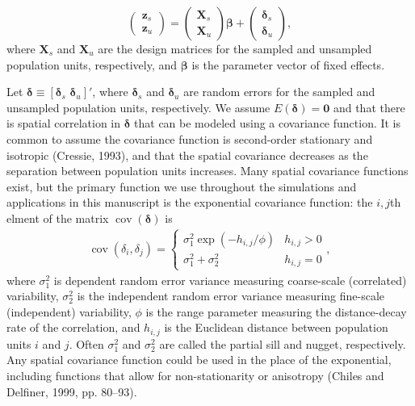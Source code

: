 \documentclass[]{elsarticle} %
\begin{document}
\begin{equation}
\begin{pmatrix} \label{equation:Zmarginal}
    \mathbf{z}_s      \\
    \mathbf{z}_u
\end{pmatrix}
=
\begin{pmatrix}
  \mathbf{X}_s    \\
  \mathbf{X}_u
\end{pmatrix}
\bm{\beta} +
\begin{pmatrix}
\bm{\delta}_s    \\
\bm{\delta}_u
\end{pmatrix},
\end{equation} where \(\mathbf{X}_s\) and \(\mathbf{X}_u\) are the
design matrices for the sampled and unsampled population units,
respectively, and \(\bm{\beta}\) is the parameter vector of fixed
effects.

Let \(\bm{\delta} \equiv [\bm{\delta}_s \,\, \bm{\delta}_u]'\), where
\(\bm{\delta}_s\) and \(\bm{\delta}_u\) are random errors for the
sampled and unsampled population units, respectively. We assume
\(E(\bm{\delta}) = \mathbf{0}\) and that there is spatial correlation in
\(\bm{\delta}\) that can be modeled using a covariance function. It is
common to assume the covariance function is second-order stationary and
isotropic (Cressie, 1993), and that the spatial covariance decreases as
the separation between population units increases. Many spatial
covariance functions exist, but the primary function we use throughout
the simulations and applications in this manuscript is the exponential
covariance function: the \(i,j\)th elment of the matrix
\(\mathop{\mathrm{{cov}}}(\bm{\delta})\) is \mbox{}
\begin{align}\label{equation:expcov}
\mathop{\mathrm{{cov}}}(\delta_i, \delta_j) = 
\begin{cases} 
\sigma^2_{1}\exp(-h_{i,j}/\phi) & h_{i,j} > 0 \\
\sigma^2_{1} + \sigma^2_2 & h_{i,j} = 0
\end{cases}
,
\end{align} where \(\sigma^2_{1}\) is dependent random error variance
measuring coarse-scale (correlated) variability, \(\sigma^2_{2}\) is the
independent random error variance measuring fine-scale (independent)
variability, \(\phi\) is the range parameter measuring the
distance-decay rate of the correlation, and \(h_{i,j}\) is the Euclidean
distance between population units \(i\) and \(j\). Often
\(\sigma^2_{1}\) and \(\sigma^2_{2}\) are called the partial sill and
nugget, respectively. Any spatial covariance function could be used in
the place of the exponential, including functions that allow for
non-stationarity or anisotropy (Chiles and Delfiner, 1999, pp. 80--93).
\end{document}
